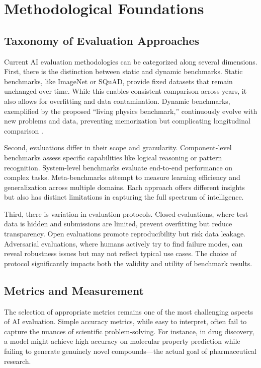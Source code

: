 \documentclass[10pt,twocolumn]{article}
\begin{document}
\section{Methodological Foundations}

\subsection{Taxonomy of Evaluation Approaches}

Current AI evaluation methodologies can be categorized along several dimensions. First, there is the distinction between static and dynamic benchmarks. Static benchmarks, like ImageNet or SQuAD, provide fixed datasets that remain unchanged over time. While this enables consistent comparison across years, it also allows for overfitting and data contamination. Dynamic benchmarks, exemplified by the proposed ``living physics benchmark,'' continuously evolve with new problems and data, preventing memorization but complicating longitudinal comparison \cite{physbench2024}.

Second, evaluations differ in their scope and granularity. Component-level benchmarks assess specific capabilities like logical reasoning or pattern recognition. System-level benchmarks evaluate end-to-end performance on complex tasks. Meta-benchmarks attempt to measure learning efficiency and generalization across multiple domains. Each approach offers different insights but also has distinct limitations in capturing the full spectrum of intelligence.

Third, there is variation in evaluation protocols. Closed evaluations, where test data is hidden and submissions are limited, prevent overfitting but reduce transparency. Open evaluations promote reproducibility but risk data leakage. Adversarial evaluations, where humans actively try to find failure modes, can reveal robustness issues but may not reflect typical use cases. The choice of protocol significantly impacts both the validity and utility of benchmark results.

\subsection{Metrics and Measurement}

The selection of appropriate metrics remains one of the most challenging aspects of AI evaluation. Simple accuracy metrics, while easy to interpret, often fail to capture the nuances of scientific problem-solving. For instance, in drug discovery, a model might achieve high accuracy on molecular property prediction while failing to generate genuinely novel compounds—the actual goal of pharmaceutical research.
\end{document}
